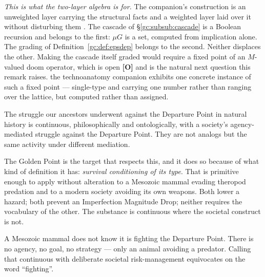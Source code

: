 \begin{remark}
\begin{remark}
\emph{This is what the two-layer algebra is for.} The companion's
construction is an unweighted layer carrying the structural facts and a
weighted layer laid over it without disturbing them
\cite{AethusTree}. The cascade of \S\ref{gc:subsub:cascade} is a Boolean
recursion and belongs to the first: $\mu G$ is a set, computed from
implication alone. The grading of
Definition~\ref{gc:def:epsdep} belongs to the second. Neither
displaces the other. Making the cascade itself graded would require a
fixed point of an $M$-valued doom operator, which is open \textbf{[O]}
and is the natural next question this remark raises.
the technoanatomy companion \cite{GoldenTechnoanatomy} exhibits one concrete instance of such a
fixed point --- single-type and carrying one number rather than ranging
over the lattice, but computed rather than assigned.
\end{remark}
\end{remark}

\begin{principle}\label{gc:prin:continuity}
The struggle our ancestors underwent against the Departure Point in
natural history is continuous, philosophically and ontologically, with a
society's agency-mediated struggle against the Departure Point. They are
not analogs but the same activity under different mediation.
\end{principle}

The Golden Point is the target that respects this, and it does so
because of what kind of definition it has: \emph{survival conditioning
of its type}. That is primitive enough to apply without alteration to a
Mesozoic mammal evading theropod predation and to a modern society
avoiding its own weapons. Both lower a hazard; both prevent an
Imperfection Magnitude Drop; neither requires the vocabulary of the
other. The substance is continuous where the societal construct is not.

\begin{objection}[Agency]\label{gc:obj:agency}
A Mesozoic mammal does not know it is fighting the Departure Point.
There is no agency, no goal, no strategy --- only an animal avoiding a
predator. Calling that continuous with deliberate societal
risk-management equivocates on the word ``fighting''.
\end{objection}

